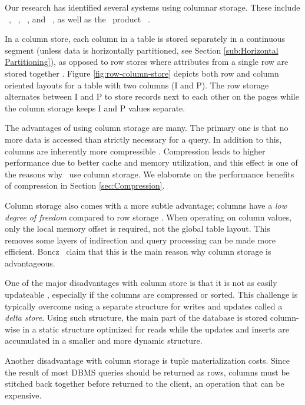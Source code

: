 Our research has identified several systems using columnar storage. These include \monetdb~\cite{Boncz2005-wj, Boncz2002-yj}, \cstore~\cite{Stonebraker2005-qz}, \saph~\cite{Farber2012-vh}, and \mssql~\cite{noauthor_undated-vq, Larson2013-mc}, as well as the \bd~product \tableau~\cite{Kamkolkar2015-iq}.

In a column store, each column in a table is stored separately in a continuous segment (unless data is horizontally partitioned, see Section \ref{sub:Horizontal Partitioning}), as opposed to row stores where attributes from a single row are stored together \cite{Bjorklund2011-wh}. Figure \ref{fig:row-column-store} depicts both row and column oriented layouts for a table with two columns (I and P). The row storage alternates between I and P to store records next to each other on the pages while the column storage keeps I and P values separate. 

The advantages of using column storage are many. The primary one is that no more data is accessed than strictly necessary for a query. In addition to this, columns are inherently more compressible \cite{noauthor_undated-vq}. Compression leads to higher performance due to better cache and memory utilization, and this effect is one of the reasons why \mssql~use column storage. We elaborate on the performance benefits of compression in Section \ref{sec:Compression}.

Column storage also comes with a more subtle advantage; columns have a \textit{low degree of freedom} compared to row storage \cite{Boncz2005-wj}. When operating on column values, only the local memory offset is required, not the global table layout. This removes some layers of indirection and query processing can be made more efficient. Boncz \ea~claim that this is the main reason why column storage is advantageous.

One of the major disadvantages with column store is that it is not as easily updateable \cite{Bjorklund2011-wh}, especially if the columns are compressed or sorted. This challenge is typically overcome using a separate structure for writes and updates called a \textit{delta store}. Using such structure, the main part of the database is stored column-wise in a static structure optimized for reads while the updates and inserts are accumulated in a smaller and more dynamic structure.  

Another disadvantage with column storage is tuple materialization costs. Since the result of most DBMS queries should be returned as rows, columns must be stitched back together before returned to the client, an operation that can be expensive.


